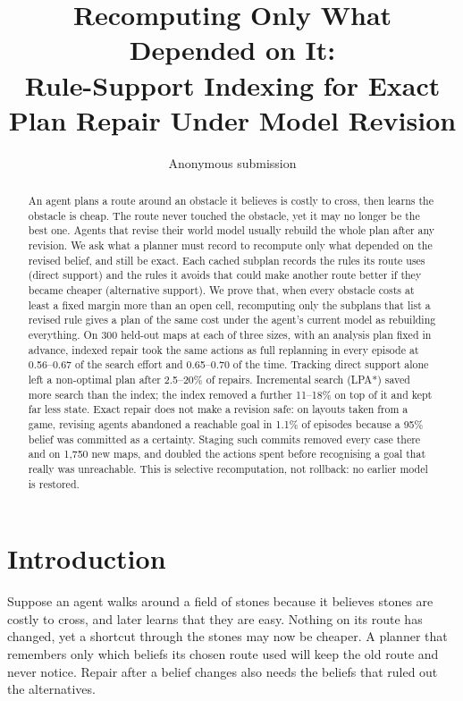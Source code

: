 \documentclass[letterpaper]{article}
\title{Recomputing Only What Depended on It:\\Rule-Support Indexing for Exact Plan Repair Under Model Revision}
\author{Anonymous submission}
\begin{document}
\maketitle

\begin{abstract}
An agent plans a route around an obstacle it believes is costly to cross, then learns the obstacle is cheap. The route never touched the obstacle, yet it may no longer be the best one. Agents that revise their world model usually rebuild the whole plan after any revision. We ask what a planner must record to recompute only what depended on the revised belief, and still be exact. Each cached subplan records the rules its route uses (direct support) and the rules it avoids that could make another route better if they became cheaper (alternative support). We prove that, when every obstacle costs at least a fixed margin more than an open cell, recomputing only the subplans that list a revised rule gives a plan of the same cost under the agent's current model as rebuilding everything. On 300 held-out maps at each of three sizes, with an analysis plan fixed in advance, indexed repair took the same actions as full replanning in every episode at 0.56--0.67 of the search effort and 0.65--0.70 of the time. Tracking direct support alone left a non-optimal plan after 2.5--20\% of repairs. Incremental search (LPA*) saved more search than the index; the index removed a further 11--18\% on top of it and kept far less state. Exact repair does not make a revision safe: on layouts taken from a game, revising agents abandoned a reachable goal in 1.1\% of episodes because a 95\% belief was committed as a certainty. Staging such commits removed every case there and on 1,750 new maps, and doubled the actions spent before recognising a goal that really was unreachable. This is selective recomputation, not rollback: no earlier model is restored.
\end{abstract}

\section{Introduction}

Suppose an agent walks around a field of stones because it believes stones are costly to cross, and later learns that they are easy. Nothing on its route has changed, yet a shortcut through the stones may now be cheaper. A planner that remembers only which beliefs its chosen route used will keep the old route and never notice. Repair after a belief changes also needs the beliefs that ruled out the alternatives.
\end{document}
